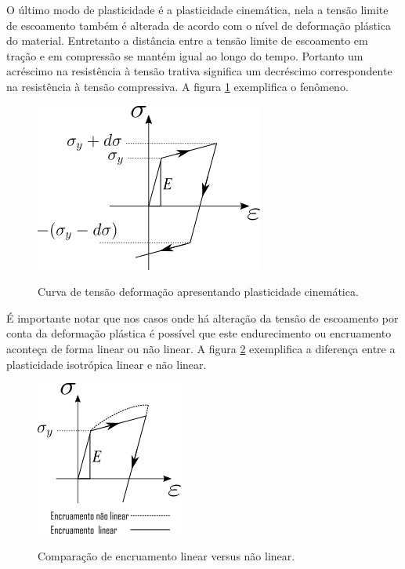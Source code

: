 O último modo de plasticidade é a plasticidade cinemática, nela a tensão limite de escoamento também é alterada de acordo com o nível de deformação plástica do material. Entretanto a distância entre a tensão limite de escoamento em tração e em compressão se mantém igual ao longo do tempo. Portanto um acréscimo na resistência à tensão trativa significa um decréscimo correspondente na resistência à tensão compressiva. A figura \ref{fig:plastcin} exemplifica o fenômeno. \par

\begin{figure}[H]
    \centering
    \caption{Curva de tensão deformação apresentando plasticidade cinemática. }
    \includegraphics[width=0.5\linewidth]{images/plasticidade_cinem.png}
    \label{fig:plastcin}
\end{figure}

É importante notar que nos casos onde há alteração da tensão de escoamento por conta da deformação plástica é possível que este endurecimento ou encruamento aconteça de forma linear ou não linear. A figura \ref{fig:plastlinvsnlin} exemplifica a diferença entre a plasticidade isotrópica linear e não linear. \par

\begin{figure}[H]
    \centering
    \caption{Comparação de encruamento linear versus não linear. } 
    \includegraphics[width=0.8\linewidth]{images/plasticidade_linnlin.png}
    \label{fig:plastlinvsnlin}
\end{figure}

